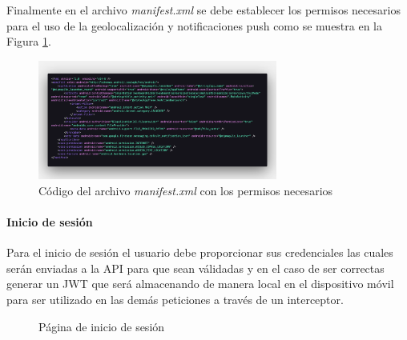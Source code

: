 Finalmente en el archivo \textit{manifest.xml} se debe establecer los permisos necesarios para el uso de la geolocalización y notificaciones push como se muestra en la Figura \ref{fig:app-manifest}.

\begin{figure}[H]
    \centering
    \includegraphics[width=0.7\textwidth]{resources/images/app-manifest}
    \caption{Código del archivo \textit{manifest.xml} con los permisos necesarios}
    \label{fig:app-manifest}
\end{figure}

\paragraph{Inicio de sesión}

Para el inicio de sesión el usuario debe proporcionar sus credenciales las cuales serán enviadas a la API para que sean válidadas y en el caso de ser correctas generar un JWT que será almacenando de manera local en el dispositivo móvil para ser utilizado en las demás peticiones a través de un interceptor.

\begin{figure}[H]
    \centering
    \caption{Página de inicio de sesión}
    \label{fig:app-login}
\end{figure}

